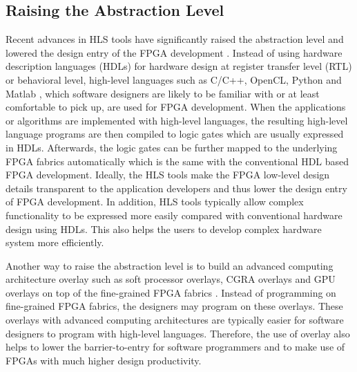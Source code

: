 \subsection{Raising the Abstraction Level}
Recent advances in HLS tools have significantly raised the abstraction level and lowered the design entry of the FPGA development \cite{cong2011high}. Instead of using hardware description languages (HDLs) for hardware design at register transfer level (RTL) or behavioral level, high-level languages such as C/C++, OpenCL, Python and Matlab \cite{canis2011legup, cardoso2011compilation, handel-c, ROCCC, matlab, myhdl, OpenCL, VivadoHLS}, which software designers are likely to be familiar with or at least comfortable to pick up, are used for FPGA development. When the applications or algorithms are implemented with high-level languages, the resulting high-level language programs are then compiled to logic gates which are usually expressed in HDLs. Afterwards, the logic gates can be further mapped to the underlying FPGA fabrics automatically which is the same with the conventional HDL based FPGA development. Ideally, the HLS tools make the FPGA low-level design details transparent to the application developers and thus lower the design entry of FPGA development. In addition, HLS tools typically allow complex functionality to be expressed more easily compared with conventional hardware design using HDLs. This also helps the users to develop complex hardware system more efficiently. 

Another way to raise the abstraction level is to build an advanced computing architecture overlay such as soft processor overlays, CGRA overlays and GPU overlays on top of the fine-grained FPGA fabrics \cite{cheah2012iDEA, laforest2012OCTAVO, yiannacouras2007exploration, ferreira2011fpga, kissler2006dynamically, shukla2006quku, lin2012energy, capalijia2013pipelined, jeffrey2011potential}. Instead of programming on fine-grained FPGA fabrics, the designers may program on these overlays. These overlays with advanced computing architectures are typically easier for software designers to program with high-level languages. Therefore, the use of overlay also helps to lower the barrier-to-entry for software programmers and to make use of FPGAs with much higher design productivity. 

